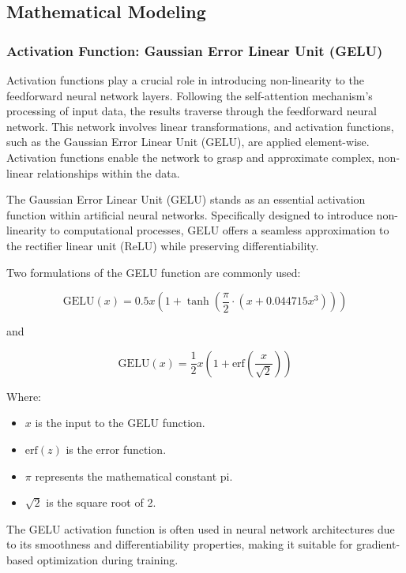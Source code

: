 \subsection{Mathematical Modeling}

\subsubsection{Activation Function: Gaussian Error Linear Unit (GELU)}
Activation functions play a crucial role in introducing non-linearity to the feedforward neural network layers. Following the self-attention mechanism's processing of input data, the results traverse through the feedforward neural network. This network involves linear transformations, and activation functions, such as the Gaussian Error Linear Unit (GELU), are applied element-wise. Activation functions enable the network to grasp and approximate complex, non-linear relationships within the data.

\noindent The Gaussian Error Linear Unit (GELU) stands as an essential activation function within artificial neural networks. Specifically designed to introduce non-linearity to computational processes, GELU offers a seamless approximation to the rectifier linear unit (ReLU) while preserving differentiability.

\noindent Two formulations of the GELU function are commonly used:

\begin{equation}
    \text{GELU}(x) = 0.5x \left(1 + \tanh\left(\frac{\pi}{2} \cdot \left(x + 0.044715x^3\right)\right)\right) \label{eq:gelu}
\end{equation}

\noindent and

\begin{equation}
    \text{GELU}(x) = \frac{1}{2}x \left(1 + \text{erf}\left(\frac{x}{\sqrt{2}}\right)\right) \label{eq:gelu2}
\end{equation}

\noindent Where:
\begin{itemize}
    \item $x$ is the input to the GELU function.
    \item $\text{erf}(z)$ is the error function.
    \item $\pi$ represents the mathematical constant pi.
    \item $\sqrt{2}$ is the square root of 2.
\end{itemize}

\noindent The GELU activation function is often used in neural network architectures due to its smoothness and differentiability properties, making it suitable for gradient-based optimization during training.

